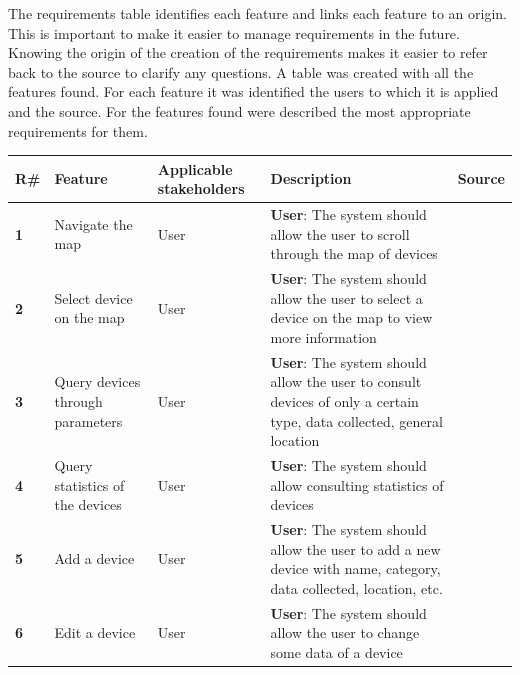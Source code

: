 \documentclass{scrreprt}
\begin{document}
The requirements table identifies each feature and links each feature to an origin.
\newline
This is important to make it easier to manage requirements in the future.
Knowing the origin of the creation of the requirements makes it easier to
refer back to the source to clarify any questions.
\newline
A table was created with all the features found. For each feature it was identified
the users to which it is applied and the source.
\newline
For the features found were described the most appropriate requirements for
them. \\
\begin{table}[H]
    \centering
    \begin{adjustbox}{width=1.2\textwidth,center=\textwidth}
    \begin{tabular}{|l|p{}|p{}|p{}|p{}|}
        \hline
        \rowcolor{green!20}
        \textbf{R\#} & \textbf{Feature} & \textbf{Applicable stakeholders} & \textbf{Description} & \textbf{Source} \\
        \hline
        \textbf{1} & Navigate the map & User & \textbf{User}: The system should allow the user to scroll through the map of devices & \cite{nelson2023preparation} \\
        \hline
        \textbf{2} & Select device on the map & User & \textbf{User}: The system should allow the user to select a device on the map to view more information & \cite{nelson2023preparation} \\
        \hline
        \textbf{3} & Query devices through parameters & User & \textbf{User}: The system should allow the user to consult devices of only a certain type, data collected, general location & \cite{nelson2023preparation} \\
        \hline
        \textbf{4} & Query statistics of the devices & User & \textbf{User}: The system should allow consulting statistics of devices & \cite{nelson2023preparation} \\
        \hline
        \textbf{5} & Add a device & User & \textbf{User}: The system should allow the user to add a new device with name, category, data collected, location, etc. & \cite{nelson2023preparation} \\
        \hline
        \textbf{6} & Edit a device & User & \textbf{User}: The system should allow the user to change some data of a device & \cite{nelson2023preparation} \\

\end{tabular}
\end{adjustbox}
\end{table}
\end{document}
